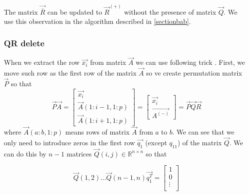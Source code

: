 \begin{note} \label{qnotrequired}
The matrix $\vec{\overline{R}}$  can be updated to $\vec{R}^{(+)}$  without the presence of matrix $\vec{Q}$. We use this observation  in the algorithm described in \ref{sectionbab}.
\end{note}




\subsubsection*{QR delete}
When we extract the row $\vec{x_i}$ from matrix $\vec{A}$ we can use following trick \cite{hammarling2008updatingqr}. First, we move such row as the first row of the matrix $\vec{A}$ so ve create permutation matrix $\vec{P}$ so that 
\begin{equation}
    \vec{P}\vec{A} = \begin{bmatrix}
        \vec{x_i} \\
        \vec{A}(1:i-1 , 1:p) \\
        \vec{A}(1:i+1 , 1:p) 
    \end{bmatrix}
    = 
    \begin{bmatrix}
        \vec{x_i} \\
        \vec{A^{(-)}}
    \end{bmatrix}
    = \vec{P}\vec{Q}\vec{R}
\end{equation} 
where $\vec{A}(a:b , 1:p) $ means rows of matrix $\vec{A}$ from $a$ to $b$.
We can see that we only need to introduce zeros in the first row $\vec{q_1}$ (except $q_{11}$) of the matrix $\vec{Q}$. We can do this by $n-1$ matrices $\vec{Q}(i,j) \in \mathbb{R}^{n \times n}$ so that

\begin{equation}
    \vec{Q}(1,2) \ldots \vec{Q}(n-1,n)\vec{q_1^T} =     \begin{bmatrix}
        1 \\
        0\\
        \vdots \\
    \end{bmatrix}
\end{equation}

